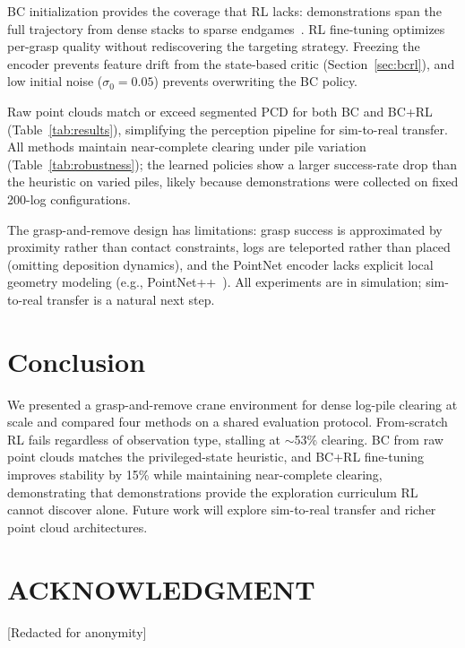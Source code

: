 \documentclass[conference]{IEEEtran}
\begin{document}
BC initialization provides the coverage that RL lacks: demonstrations span the full trajectory from dense stacks to sparse endgames~\cite{rajeswaran2018learning}.
RL fine-tuning optimizes per-grasp quality without rediscovering the targeting strategy.
Freezing the encoder prevents feature drift from the state-based critic (Section~\ref{sec:bcrl}), and low initial noise ($\sigma_0 = 0.05$) prevents overwriting the BC policy.

Raw point clouds match or exceed segmented PCD for both BC and BC+RL (Table~\ref{tab:results}), simplifying the perception pipeline for sim-to-real transfer.
All methods maintain near-complete clearing under pile variation (Table~\ref{tab:robustness}); the learned policies show a larger success-rate drop than the heuristic on varied piles, likely because demonstrations were collected on fixed 200-log configurations.

The grasp-and-remove design has limitations: grasp success is approximated by proximity rather than contact constraints, logs are teleported rather than placed (omitting deposition dynamics), and the PointNet encoder lacks explicit local geometry modeling (e.g., PointNet++~\cite{qi2017pointnetplusplus}).
All experiments are in simulation; sim-to-real transfer is a natural next step.

\section{Conclusion}
We presented a grasp-and-remove crane environment for dense log-pile clearing at scale and compared four methods on a shared evaluation protocol.
From-scratch RL fails regardless of observation type, stalling at $\sim$53\% clearing.
BC from raw point clouds matches the privileged-state heuristic, and BC+RL fine-tuning improves stability by 15\% while maintaining near-complete clearing, demonstrating that demonstrations provide the exploration curriculum RL cannot discover alone.
Future work will explore sim-to-real transfer and richer point cloud architectures.

\section*{ACKNOWLEDGMENT}
[Redacted for anonymity]



\end{document}
